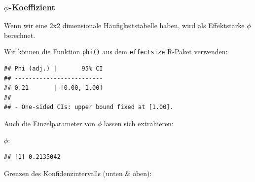 \documentclass[
]{book}
\newenvironment{Shaded}{\begin{snugshade}}{\end{snugshade}}
\newcommand{\FunctionTok}[1]{\textcolor[rgb]{0.00,0.00,0.00}{#1}}
\newcommand{\NormalTok}[1]{#1}
\newcommand{\SpecialCharTok}[1]{\textcolor[rgb]{0.00,0.00,0.00}{#1}}
\begin{document}
\hypertarget{phi-koeffizient}{%
\subsubsection{\texorpdfstring{\(\phi\)-Koeffizient}{\textbackslash phi-Koeffizient}}\label{phi-koeffizient}}

Wenn wir eine 2x2 dimensionale Häufigkeitstabelle haben, wird als Effektstärke \(\phi\) berechnet.

Wir können die Funktion \texttt{phi()} aus dem \texttt{effectsize} R-Paket verwenden:

\begin{Shaded}
\end{Shaded}

\begin{verbatim}
## Phi (adj.) |       95% CI
## -------------------------
## 0.21       | [0.00, 1.00]
## 
## - One-sided CIs: upper bound fixed at [1.00].
\end{verbatim}

Auch die Einzelparameter von \(\phi\) lassen sich extrahieren:

\(\phi\):

\begin{Shaded}
\end{Shaded}

\begin{verbatim}
## [1] 0.2135042
\end{verbatim}

Grenzen des Konfidenzintervalls (unten \& oben):

\begin{Shaded}
\end{Shaded}
\end{document}
